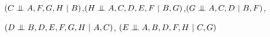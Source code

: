 $\condindep{C}{A, F, G, H}{B}$,$\condindep{H}{A, C, D, E, F}{B, G}$,$\condindep{G}{A, C, D}{B, F}$,

$\condindep{D}{B, D, E, F, G, H}{A, C}$, $\condindep{E}{A, B, D, F, H}{C, G}$

